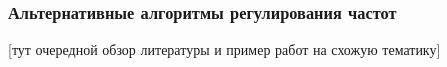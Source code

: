 \subsubsection{Альтернативные алгоритмы регулирования частот}

    [тут очередной обзор литературы и пример работ на схожую тематику]







